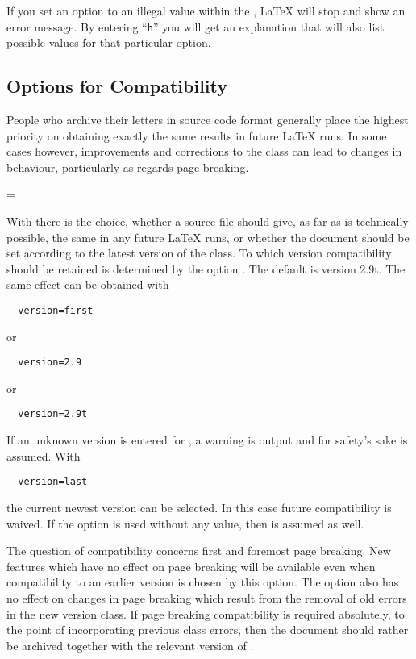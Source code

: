 \begin{Explain}
  If you set an option to an illegal value within the , {\LaTeX} will stop and show an error message. By entering
  ``\texttt{h}'' you will get an explanation that will also list
  possible values for that particular option.
\end{Explain}
%
%
%

\subsection{Options for  Compatibility}
\label{sec:scrlttr2.compatibilityOptions}
%

People who archive their letters in source code format generally place
the highest priority on obtaining exactly the same results in future
{\LaTeX} runs. In some cases however, improvements and corrections to
the class can lead to changes in behaviour, particularly as regards
page breaking.

\begin{Declaration}
  =
\end{Declaration}
%
With  there is the
choice, whether a source file should give, as far as is technically
possible, the same in any future {\LaTeX} runs, or whether the
document should be set according to the latest version of the
class. To which version compatibility should be retained is determined
by the option . The default is version 2.9t. The same effect can be obtained with
\begin{lstlisting}
  version=first
\end{lstlisting}
or
\begin{lstlisting}
  version=2.9
\end{lstlisting}
or
\begin{lstlisting}
  version=2.9t
\end{lstlisting}
If an unknown version is entered for , a warning is
output and for safety's sake  is
assumed. With
\begin{lstlisting}
  version=last
\end{lstlisting}
the current newest version can be selected. In this case future
compatibility is waived. If the option is used without any value, then
 is assumed as well.

The question of compatibility concerns first and foremost page
breaking. New features which have no effect on page breaking will be
available even when compatibility to an earlier version is chosen by
this option. The option also has no effect on changes in page breaking
which result from the removal of old errors in the new version
class. If page breaking compatibility is required absolutely, to the
point of incorporating previous class errors, then the document should
rather be archived together with the relevant version of \KOMAScript.

